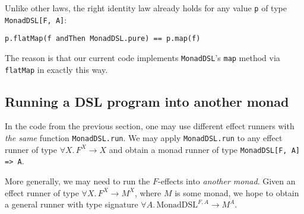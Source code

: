 Unlike other laws, the right identity law already holds for any value
\lstinline!p! of type \lstinline!MonadDSL[F, A]!:
\begin{lstlisting}
p.flatMap(f andThen MonadDSL.pure) == p.map(f)
\end{lstlisting}
The reason is that our current code implements \lstinline!MonadDSL!\textsf{'}s
\lstinline!map! method
via \lstinline!flatMap!
in exactly this way. 

\subsection{Running a DSL program into another monad}

In the code from the previous section, one may use different effect
runners with \emph{the same} function \lstinline!MonadDSL.run!.
We may apply \lstinline!MonadDSL.run!
to any effect runner of type $\forall X.\,F^{X}\rightarrow X$ and
obtain a monad runner of type \lstinline!MonadDSL[F, A] => A!.

More generally, we may need to run the $F$-effects into \emph{another
monad}. Given an effect runner of type $\forall X.\,F^{X}\rightarrow M^{X}$,
where $M$ is some monad, we hope to obtain a general runner with
type signature $\forall A.\,\text{MonadDSL}^{F,A}\rightarrow M^{A}$.

